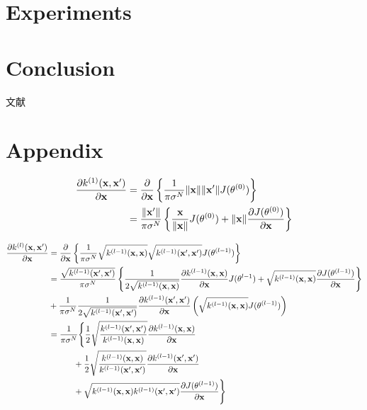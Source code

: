 \documentclass[11pt,a4j]{article}
\begin{document}
  \section{Experiments}
  \section{Conclusion}
    文献\cite{Hinton1995BayesianLF}
    \cite{DLGP2018} \cite{KMDL2009} \cite{LawrenceGPLVM2004} \cite{LawrenceGPLVM2005}
    \cite{SparseGP2006} \cite{VariationalSparseGP2009} \cite{BayesGP2010}
    \cite{GPBIGDATA2013}

  \section{Appendix}
    \begin{align}
      \frac{\partial k^{(1)}({\bf x}, {\bf x}')}{\partial {\bf x}} 
      &= \frac{\partial}{\partial {\bf x}} \left\{ \frac{1}{\pi \sigma^N} \|{\bf x}\| \|{\bf x}'\| J(\theta^{(0)}) \right\} \\
      &= \frac{ \|{\bf x}'\| }{\pi \sigma^N} \left\{ \frac{\bf x}{\|{\bf x}\|} J(\theta^{(0)}) + \|{\bf x}\| \frac{\partial J(\theta^{(0)})}{\partial {\bf x}} \right\} \\
    \end{align}
     
    \begin{align}      
      \frac{\partial k^{(l)}({\bf x}, {\bf x}')}{\partial {\bf x}} 
      &= \frac{\partial}{\partial {\bf x}} \left\{ \frac{1}{\pi \sigma^N} \sqrt{ k^{(l-1)}({\bf x}, {\bf x}) } \sqrt{ k^{(l-1)}({\bf x}', {\bf x}') } J(\theta^{(l-1)}) \right\} \\
      &= \frac{ \sqrt{ k^{(l-1)}({\bf x}', {\bf x}') } }{\pi \sigma^N} \left\{ \frac{1}{2 \sqrt{ k^{(l-1)}({\bf x}, {\bf x}) }} \frac{\partial k^{(l-1)}({\bf x}, {\bf x}) }{\partial {\bf x}} J(\theta^{l-1}) + \sqrt{ k^{(l-1)}({\bf x}, {\bf x}) } \frac{\partial J(\theta^{(l-1)})}{\partial {\bf x}} \right\} \\
      &+ \frac{1}{\pi \sigma^N} \frac{1}{2 \sqrt{k^{(l-1)}({\bf x}', {\bf x}')}} \frac{\partial k^{(l-1)}({\bf x}', {\bf x}')}{\partial {\bf x}} \left( \sqrt{ k^{(l-1)}({\bf x}, {\bf x}) } J(\theta^{(l-1)}) \right) \\
      &= \frac{1}{\pi \sigma^N} \Biggl\{ \frac{1}{2} \sqrt{\frac{k^{(l-1)}({\bf x}', {\bf x}')}{k^{(l-1)}({\bf x}, {\bf x})}} \frac{\partial k^{(l-1)}({\bf x}, {\bf x}) }{\partial {\bf x}} \\
      &\hspace{3em}                   + \frac{1}{2} \sqrt{ \frac{k^{(l-1)}({\bf x}, {\bf x})}{k^{(l-1)}({\bf x}', {\bf x}')} } \frac{\partial k^{(l-1)}({\bf x}', {\bf x}') }{\partial {\bf x}} \\
      &\hspace{3em}                   + \sqrt{k^{(l-1)}({\bf x}, {\bf x}) k^{(l-1)}({\bf x}', {\bf x}')} \frac{\partial J(\theta^{(l-1)})}{\partial {\bf x}} \Biggr\}
    \end{align}
\end{document}
